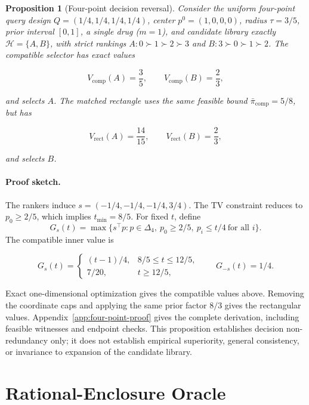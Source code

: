 \documentclass[preprint,review,12pt]{elsarticle}
\newcommand{\Hlib}{\mathcal{H}}
\newtheorem{proposition}{Proposition}
\begin{document}
\begin{proposition}[Four-point decision reversal]
\label{prop:four-point-reversal}
Consider the uniform four-point query design
\(Q=(1/4,1/4,1/4,1/4)\), center \(p^0=(1,0,0,0)\), radius
\(\tau=3/5\), prior interval \([0,1]\), a single drug (\(m=1\)), and candidate library exactly
\(\Hlib=\{A,B\}\), with strict rankings
\(A:0\succ1\succ2\succ3\) and \(B:3\succ0\succ1\succ2\).
The compatible selector has exact values

\begin{equation}
V_{\mathrm{comp}}(A)=\frac35,
\qquad
V_{\mathrm{comp}}(B)=\frac23,
\end{equation}

and selects \(A\). The matched rectangle uses the same feasible bound
\(\bar\pi_{\mathrm{comp}}=5/8\), but has

\begin{equation}
V_{\mathrm{rect}}(A)=\frac{14}{15},
\qquad
V_{\mathrm{rect}}(B)=\frac23,
\end{equation}

and selects \(B\).
\end{proposition}

\paragraph{Proof sketch.}
The rankers induce \(s=(-1/4,-1/4,-1/4,3/4)\). The TV constraint reduces to
\(p_0\geq2/5\), which implies \(t_{\min}=8/5\). For fixed \(t\), define
\[
G_s(t)=\max\{s^\top p:p\in\Delta_4,\ p_0\geq2/5,\
p_i\leq t/4\ \text{for all }i\}.
\]
The compatible inner value is

\begin{equation}
G_s(t)=
\begin{cases}
(t-1)/4, & 8/5\leq t\leq12/5,\\
7/20, & t\geq12/5,
\end{cases}
\qquad
G_{-s}(t)=1/4.
\end{equation}

Exact one-dimensional optimization gives the compatible values above. Removing
the coordinate caps and applying the same prior factor \(8/3\) gives the
rectangular values. Appendix~\ref{app:four-point-proof} gives the complete
derivation, including feasible witnesses and endpoint checks. This proposition
establishes decision non-redundancy only; it does not establish empirical
superiority, general consistency, or invariance to expansion of the candidate
library.

\section{Rational-Enclosure Oracle}
\end{document}
